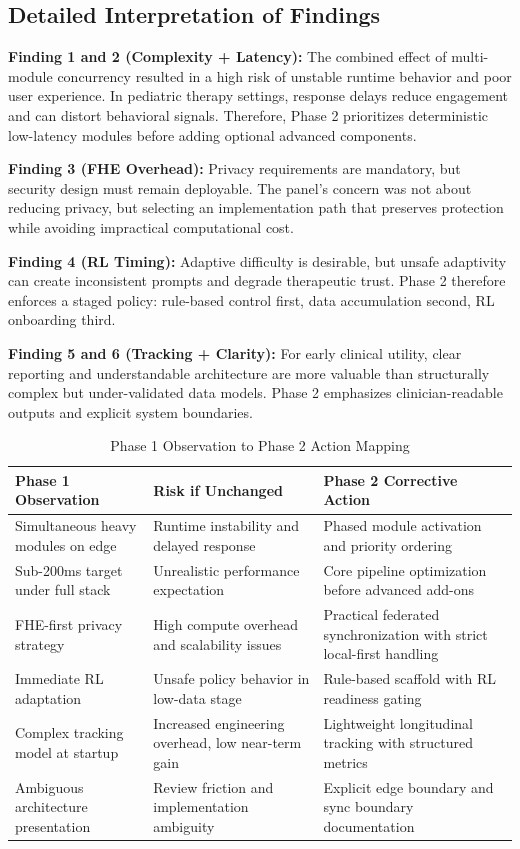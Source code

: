 \documentclass[12pt,a4paper]{article}
\begin{document}
\subsection{Detailed Interpretation of Findings}
\textbf{Finding 1 and 2 (Complexity + Latency):} The combined effect of multi-module concurrency resulted in a high risk of unstable runtime behavior and poor user experience. In pediatric therapy settings, response delays reduce engagement and can distort behavioral signals. Therefore, Phase 2 prioritizes deterministic low-latency modules before adding optional advanced components.

\textbf{Finding 3 (FHE Overhead):} Privacy requirements are mandatory, but security design must remain deployable. The panel's concern was not about reducing privacy, but selecting an implementation path that preserves protection while avoiding impractical computational cost.

\textbf{Finding 4 (RL Timing):} Adaptive difficulty is desirable, but unsafe adaptivity can create inconsistent prompts and degrade therapeutic trust. Phase 2 therefore enforces a staged policy: rule-based control first, data accumulation second, RL onboarding third.

\textbf{Finding 5 and 6 (Tracking + Clarity):} For early clinical utility, clear reporting and understandable architecture are more valuable than structurally complex but under-validated data models. Phase 2 emphasizes clinician-readable outputs and explicit system boundaries.

\begin{table}[H]
\centering
\caption{Phase 1 Observation to Phase 2 Action Mapping}
\renewcommand{\arraystretch}{1.25}
\begin{tabularx}{\textwidth}{|p{3.7cm}|L|L|}
\hline
\textbf{Phase 1 Observation} & \textbf{Risk if Unchanged} & \textbf{Phase 2 Corrective Action} \\
\hline
Simultaneous heavy modules on edge & Runtime instability and delayed response & Phased module activation and priority ordering \\
\hline
Sub-200ms target under full stack & Unrealistic performance expectation & Core pipeline optimization before advanced add-ons \\
\hline
FHE-first privacy strategy & High compute overhead and scalability issues & Practical federated synchronization with strict local-first handling \\
\hline
Immediate RL adaptation & Unsafe policy behavior in low-data stage & Rule-based scaffold with RL readiness gating \\
\hline
Complex tracking model at startup & Increased engineering overhead, low near-term gain & Lightweight longitudinal tracking with structured metrics \\
\hline
Ambiguous architecture presentation & Review friction and implementation ambiguity & Explicit edge boundary and sync boundary documentation \\
\hline
\end{tabularx}
\end{table}
\end{document}

